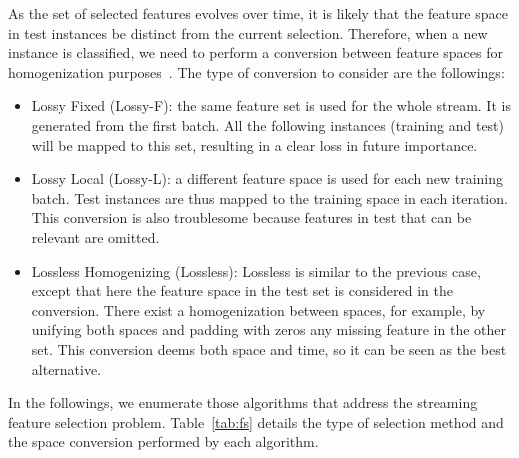 \documentclass[preprint,12pt]{elsarticle}
\begin{document}
As the set of selected features evolves over time, it is likely that the feature space in test instances be distinct from the current selection. Therefore, when a new instance is classified, we need to perform a conversion between feature spaces for homogenization purposes~\cite{masud10}. The type of conversion to consider are the followings: 
\begin{itemize}
	\item Lossy Fixed (Lossy-F): the same feature set is used for the whole stream. It is generated from the first batch. All the following instances (training and test) will be mapped to this set, resulting in a clear loss in future importance.
	\item Lossy Local (Lossy-L): a different feature space is used for each new training batch. Test instances are thus mapped to the training space in each iteration. This conversion is also troublesome because features in test that can be relevant are omitted.
	\item Lossless Homogenizing (Lossless): Lossless is similar to the previous case, except that here the feature space in the test set is considered in the conversion. There exist a homogenization between spaces, for example, by unifying both spaces and padding with zeros any missing feature in the other set. This conversion deems both space and time, so it can be seen as the best alternative.
\end{itemize}

In the followings, we enumerate those algorithms that address the streaming feature selection problem. Table~\ref{tab:fs} details the type of selection method and the space conversion performed by each algorithm.
\end{document}
